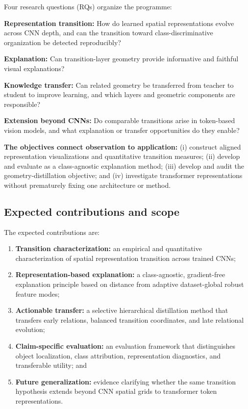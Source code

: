 Four research questions (RQs) organize the programme:

\begin{description}[leftmargin=1.3cm,style=nextline]
    \item[RQ1] \textbf{Representation transition:} How do learned spatial
    representations evolve across CNN depth, and can the transition toward
    class-discriminative organization be detected reproducibly?
    \item[RQ2] \textbf{Explanation:} Can transition-layer geometry provide
    informative and faithful visual explanations?
    \item[RQ3] \textbf{Knowledge transfer:} Can related geometry be transferred
    from teacher to student to improve learning, and which layers and geometric
    components are responsible?
    \item[RQ4] \textbf{Extension beyond CNNs:} Do comparable transitions arise
    in token-based vision models, and what explanation or transfer opportunities
    do they enable?
\end{description}

\textbf{The objectives connect observation to application:} (i) construct
aligned representation visualizations and quantitative transition measures;
(ii) develop and evaluate \methodname{} as a class-agnostic explanation method;
(iii) develop and audit the \jmethod{} geometry-distillation objective; and
(iv) investigate transformer representations without prematurely fixing one
architecture or method.

\subsection{Expected contributions and scope}

The expected contributions are:

\begin{enumerate}[leftmargin=*]
    \item \textbf{Transition characterization:} an empirical and quantitative
    characterization of spatial representation transition across trained CNNs;
    \item \textbf{Representation-based explanation:} a class-agnostic,
    gradient-free explanation principle based on distance from adaptive
    dataset-global robust feature modes;
    \item \textbf{Actionable transfer:} a selective hierarchical distillation
    method that transfers early relations, balanced transition coordinates,
    and late relational evolution;
    \item \textbf{Claim-specific evaluation:} an evaluation framework that
    distinguishes object localization, class attribution, representation
    diagnostics, and transferable utility; and
    \item \textbf{Future generalization:} evidence clarifying whether the same
    transition hypothesis extends beyond CNN spatial grids to transformer token
    representations.
\end{enumerate}

